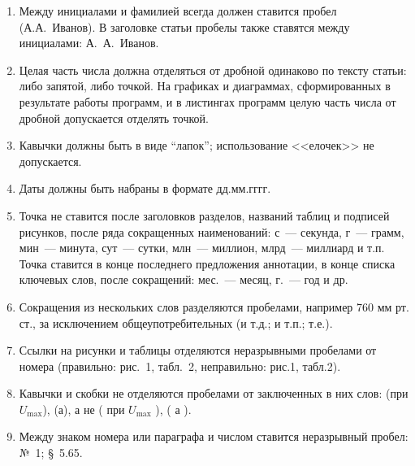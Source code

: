 \documentclass[10pt,a4paper]{book}
\begin{document}
\begin{enumerate}[itemsep=0pt,parsep=2pt,topsep=2pt,partopsep=0pt]
\item Между инициалами и фамилией всегда должен ставится пробел (А.А.~Иванов).
В заголовке статьи пробелы также ставятся между инициалами: А.~А.~Иванов.

\item Целая часть числа должна отделяться от дробной одинаково по тексту статьи:
либо запятой, либо точкой. На графиках и диаграммах, сформированных в результате
работы программ, и в листингах программ целую часть числа от дробной допускается 
отделять точкой.

\item Кавычки должны быть в виде ``лапок''; использование <<елочек>> не
допускается.

\item Даты должны быть набраны в формате дд.мм.гггг.

\item Точка не ставится после заголовков разделов, названий таблиц и
подписей рисунков, после ряда сокращенных наименований:
с~--- секунда, г~--- грамм, мин~--- минута, сут~--- сутки, млн~--- миллион,
млрд~--- миллиард и т.п. Точка ставится в конце последнего предложения аннотации, 
в конце списка ключевых слов, после сокращений: мес.~--- месяц, г.~--- год и др.

\item Сокращения из нескольких слов разделяются пробелами, например 760 мм рт. ст.,
за исключением общеупотребительных (и т.д.; и т.п.; т.е.).

\item Ссылки на рисунки и таблицы отделяются неразрывными пробелами от номера
      (правильно: рис.~1, табл.~2, неправильно: рис.1, табл.2).

\item Кавычки и скобки не отделяются пробелами от заключенных в них слов:
      (при $U_\mathrm{max}$), (а), а не ( при $U_\mathrm{max}$ ), ( а ).

\item Между знаком номера или параграфа и числом ставится неразрывный пробел: №~1; \S~5.65.
\end{enumerate}
\end{document}
